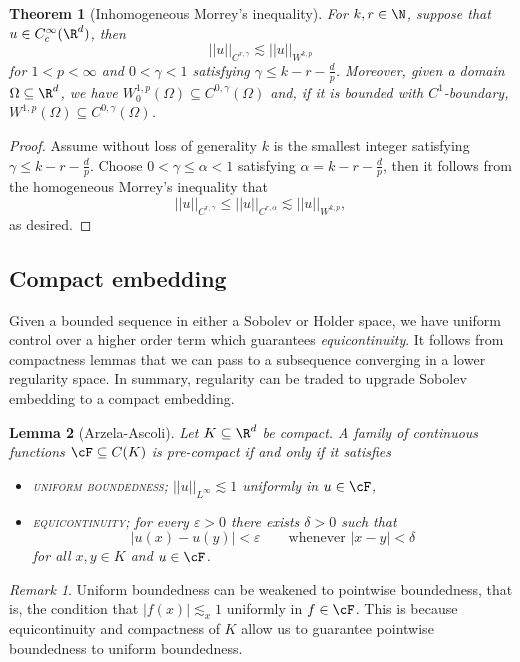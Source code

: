 \documentclass[reqno]{amsart}
\newtheorem{theorem}{Theorem}
\newtheorem{lemma}[theorem]{Lemma}
\theoremstyle{definition}
\theoremstyle{remark}
\newtheorem*{remark}{Remark}
\renewcommand{\epsilon}{\varepsilon}
\renewcommand{\emph}{\textsc}
\begin{document}
\begin{theorem}[Inhomogeneous Morrey's inequality]
	For $k, r \in \N$, suppose that $u \in C^\infty_c (\R^d)$, then 
		\[ ||u||_{C^{r, \gamma}} \lesssim ||u||_{W^{k, p}} \]
	for $1 < p < \infty$ and $0 < \gamma < 1$ satisfying $\gamma \leq k - r - \tfrac{d}{p}$. Moreover, given a domain $\Omega \subseteq \R^d$, we have $W^{1, p}_0 (\Omega) \subseteq C^{0, \gamma} (\Omega)$ and, if it is bounded with $C^1$-boundary, $W^{1, p} (\Omega) \subseteq C^{0, \gamma} (\Omega)$.
\end{theorem}

\begin{proof}
	Assume without loss of generality $k$ is the smallest integer satisfying $\gamma \leq k - r - \tfrac{d}{p}$. Choose $0 < \gamma \leq \alpha < 1$ satisfying $\alpha = k - r - \tfrac{d}{p}$, then it follows from the homogeneous Morrey's inequality that
		\[ ||u||_{C^{r, \gamma}} \leq ||u||_{C^{r, \alpha}} \lesssim ||u||_{W^{k, p}}, \]
	as desired. 	
\end{proof}


\subsection{Compact embedding}

Given a bounded sequence in either a Sobolev or Holder space, we have uniform control over a higher order term which guarantees \textit{equicontinuity}. It follows from compactness lemmas that we can pass to a subsequence converging in a lower regularity space. In summary, regularity can be traded to upgrade Sobolev embedding to a compact embedding. 

\begin{lemma}[Arzela-Ascoli]
	Let $K \subseteq \R^d$ be compact. A family of continuous functions $\cF \subseteq C(K)$ is pre-compact if and only if it satisfies
	\begin{itemize}
		\item \emph{uniform boundedness}; $||u||_{L^\infty} \lesssim 1$ uniformly in $u \in \cF$, 
		\item \emph{equicontinuity}; for every $\epsilon > 0$ there exists $\delta > 0$ such that 
					\[ |u (x) - u (y)| < \epsilon \qquad \text{whenever } |x - y| < \delta \]
				for all $x, y \in K$ and $u \in \cF$. 	
	\end{itemize}
\end{lemma}

\begin{remark}
	Uniform boundedness can be weakened to pointwise boundedness, that is, the condition that $|f(x)| \lesssim_x 1$ uniformly in $f \in \cF$. This is because equicontinuity and compactness of $K$ allow us to guarantee pointwise boundedness to uniform boundedness. 
\end{remark}
\end{document}
